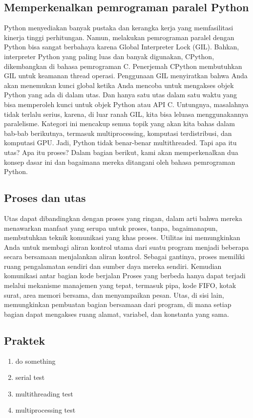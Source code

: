 \subsection{Memperkenalkan pemrograman paralel Python}
	Python menyediakan banyak pustaka dan kerangka kerja yang memfasilitasi kinerja tinggi
perhitungan. Namun, melakukan pemrograman paralel dengan Python bisa sangat berbahaya
karena Global Interpreter Lock (GIL).
Bahkan, interpreter Python yang paling luas dan banyak digunakan, CPython, dikembangkan di
bahasa pemrograman C. Penerjemah CPython membutuhkan GIL untuk keamanan thread
operasi. Penggunaan GIL menyiratkan bahwa Anda akan menemukan kunci global ketika Anda mencoba
untuk mengakses objek Python yang ada di dalam utas. Dan hanya satu utas dalam satu waktu yang bisa
memperoleh kunci untuk objek Python atau API C.
Untungnya, masalahnya tidak terlalu serius, karena, di luar ranah GIL, kita bisa leluasa menggunakannya
paralelisme. Kategori ini mencakup semua topik yang akan kita bahas dalam bab-bab berikutnya,
termasuk multiprocessing, komputasi terdistribusi, dan komputasi GPU.
Jadi, Python tidak benar-benar multithreaded. Tapi apa itu utas? Apa itu proses? Dalam
bagian berikut, kami akan memperkenalkan dua konsep dasar ini dan bagaimana mereka
ditangani oleh bahasa pemrograman Python.
\subsection{Proses dan utas}
Utas dapat dibandingkan dengan proses yang ringan, dalam arti bahwa mereka menawarkan manfaat yang serupa untuk proses, tanpa, bagaimanapun, membutuhkan teknik komunikasi yang khas proses. Utilitas ini memungkinkan Anda untuk membagi aliran kontrol utama dari suatu program menjadi beberapa secara bersamaan menjalankan aliran kontrol. Sebagai gantinya, proses memiliki ruang pengalamatan sendiri dan sumber daya mereka sendiri. Kemudian komunikasi antar bagian kode berjalan Proses yang berbeda hanya dapat terjadi melalui mekanisme manajemen yang tepat, termasuk pipa, kode FIFO, kotak surat, area memori bersama, dan menyampaikan pesan. Utas, di sisi lain, memungkinkan pembuatan bagian bersamaan dari program, di mana setiap bagian dapat mengakses ruang alamat, variabel, dan konstanta yang sama.
\subsection{Praktek}
\begin{enumerate}
	\item do something
    
	\hfill\break
	\item serial test
	\hfill\break
	
	\item multithreading test
	\hfill\break
	
	\item multiprocessing test
	\hfill\break
	
\end{enumerate}
